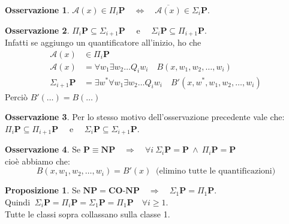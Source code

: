 \documentclass[a4paper]{article}
\theoremstyle{definition}
\newtheorem{prop}{Proposizione}[subsection]
\newtheorem{obs}{Osservazione}[subsection]
\newcommand{\p}{\mathbf{P}}
\newcommand{\np}{\mathbf{NP}}
\newcommand{\conp}{\mathbf{CO}\text{-}\mathbf{NP}}
\newcommand{\alg}[1]{\mathcal{#1}}
\begin{document}
		\begin{obs}
			$ \alg{A}(x) \in \Pi_i \p \quad \Leftrightarrow \quad \overline{\alg{A}(x)} \in \Sigma_i \p $.
		\end{obs}
		
		\begin{obs}
			$ \Pi_i \p \subseteq \Sigma_{i+1} \p \quad $ e $ \quad \Sigma_i \p \subseteq \Pi_{i+1} \p $.  \\
			Infatti se aggiungo un quantificatore all'inizio, ho che
			\begin{align*}
				\alg{A}(x) &\in \Pi_i \p \\ 
				\alg{A}(x) &= \forall w_1 \exists w_2 \dots Q_i w_i \quad B(x, w_1, w_2, \dots, w_i) \\
				\Sigma_{i+1} \p &= \exists w^* \forall w_1 \exists w_2 \dots Q_i w_i \quad B'(x, w^*, w_1, w_2, \dots, w_i)
			\end{align*}
			Perciò $ B'(\dots) = B(\dots) $
		\end{obs}
		
		\begin{obs}
			Per lo stesso motivo dell'osservazione precedente vale che:\\
			$ \Pi_i \p \subseteq \Pi_{i+1} \p \quad $ e $ \quad \Sigma_i \p \subseteq \Sigma_{i+1} \p $.  
		\end{obs}
		
		\begin{obs}
			Se $ \p \equiv \np \quad \Rightarrow \quad \forall i \ \Sigma_i \p = \p \ \wedge \ \Pi_i \p = \p $ \\
			cioè abbiamo che:
			\[
				B(x, w_1, w_2, \dots, w_i) = B'(x) \ \text{ (elimino tutte le quantificazioni)}
			\]
		\end{obs}
		
		\begin{prop}
			Se $ \np = \conp \quad \Rightarrow \quad \Sigma_1 \p = \Pi_1 \p $.\\
			Quindi $ \ \Sigma_i \p = \Pi_i \p = \Sigma_1 \p = \Pi_1 \p \quad \forall i \geq 1 $.\\
			Tutte le classi sopra collassano sulla classe 1. 
		\end{prop}
		
\end{document}
